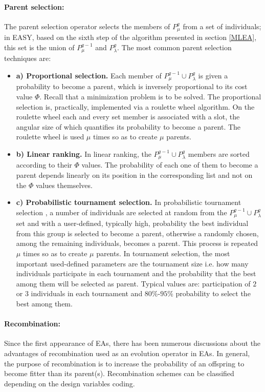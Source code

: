 \paragraph{Parent selection:}
The parent selection operator selects the members of $P_{\mu}^{g}$ from a set of individuals; in EASY, based on the sixth step of the  algorithm presented in section \ref{MLEA}, this set is the union of $P_{\mu}^{g-1}$ and $P_{\lambda}^g$. The most common parent selection techniques are: 
\begin{itemize}
\item[]{\bf a) Proportional selection.} Each member of $P_{\mu}^{g-1} \cup P_{\lambda}^g$ is given a probability to become a parent, which is inversely proportional to its cost value $\Phi$. Recall that a minimization problem is to be solved. The proportional selection is, practically, implemented via a roulette wheel algorithm. On the roulette wheel each and every set member is associated with a slot, the angular size of which quantifies its probability to become a parent. The roulette wheel is used $\mu$ times so as to create $\mu$ parents.  
\item[]{\bf b) Linear ranking.} In linear ranking, the $P_{\mu}^{g-1} \cup P_{\lambda}^g$ members are sorted according to their $\Phi$ values. The probability of each one of them to become a parent depends linearly on its position in the corresponding list and not on the $\Phi$ values themselves.
\item[]{\bf c) Probabilistic tournament selection.}
In probabilistic tournament selection \cite{goldberg1991}, a number of individuals are selected at random from the $P_{\mu}^{g-1} \cup P_{\lambda}^g$ set and with a user-defined, typically high, probability the best individual from this group is selected to become a parent, otherwise a randomly chosen, among the remaining individuals, becomes a parent. This process is repeated $\mu$ times so as to create $\mu$ parents. In tournament selection, the most important used-defined parameters are the tournament size i.e. how many individuals participate in each tournament and the probability that the best among them will be selected as parent. Typical values are: participation of $2$ or $3$ individuals in each tournament and $80\%$-$95\%$ probability to select the best among them.
\end{itemize}


\paragraph{Recombination:}
\label{RecombinationLabel}
Since the first appearance of EAs, there has been numerous discussions \cite{Schaffer87,Schaffer91,Navy92crossoveror} about the advantages of recombination used as an evolution operator in EAs. In general, the purpose of recombination is to increase the probability of an offspring to become fitter than its parent(s). Recombination schemes can be classified depending on the design variables coding. 

